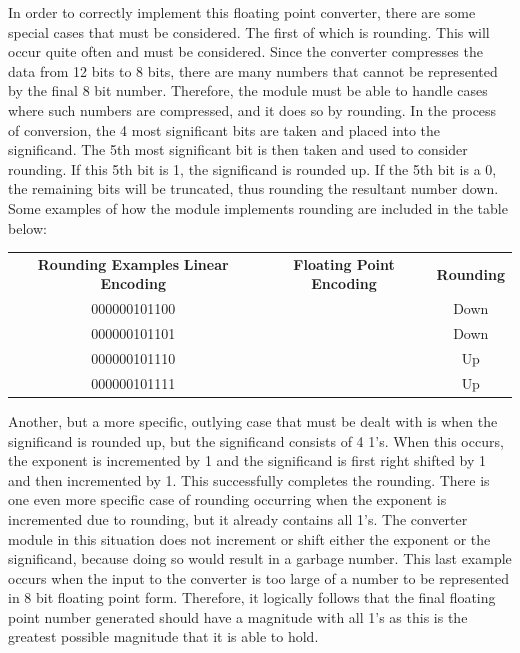 \documentclass{article}
\begin{document}
In order to correctly implement this floating point converter, there are some special cases that must be considered.  The first of which is rounding.  This will occur quite often and must be considered.  Since the converter compresses the data from 12 bits to 8 bits, there are many numbers that cannot be represented by the final 8 bit number.  Therefore, the module must be able to handle cases where such numbers are compressed, and it does so by rounding.  In the process of conversion, the 4 most significant bits are taken and placed into the significand.  The 5th most significant bit is then taken and used to consider rounding.  If this 5th bit is 1, the significand is rounded up.  If the 5th bit is a 0, the remaining bits will be truncated, thus rounding the resultant number down.  Some examples of how the module implements rounding are included in the table below:

\begin{center}
\begin{tabular}{ c c c }

\textbf{Rounding Examples}
 \textbf{Linear Encoding} & \textbf{Floating Point Encoding} & \textbf{Rounding } \\ 
000000101100 & \big[0 010 1011\big] & Down \\
000000101101 & \big[0 010 1011\big] & Down \\ 
000000101110 & \big[0 010 1100\big] & Up \\
000000101111 & \big[0 010 1100\big] & Up \\

\end{tabular}
\end{center}

Another, but a more specific, outlying case that must be dealt with is when the significand is rounded up, but the significand consists of 4 1's. When this occurs, the exponent is incremented by 1 and the significand is first right shifted by 1 and then incremented by 1.  This successfully completes the rounding.  There is one even more specific case of rounding occurring when the exponent is incremented due to rounding, but it already contains all 1's. The converter module in this situation does not increment or shift either the exponent or the significand, because doing so would result in a garbage number.  This last example occurs when the input to the converter is too large of a number to be represented in 8 bit floating point form. Therefore, it logically follows that the final floating point number generated should have a magnitude with all 1's as this is the greatest possible magnitude that it is able to hold.
\end{document}
